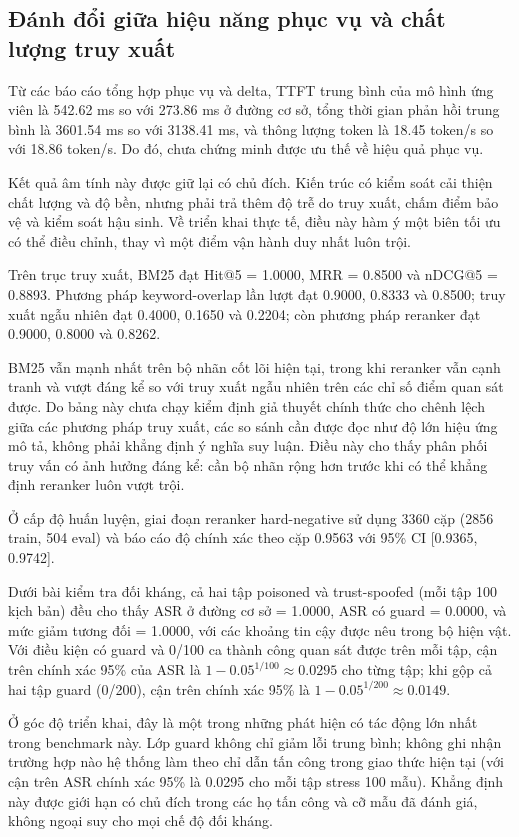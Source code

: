 ﻿\documentclass[a4paper,12pt]{article}
\begin{document}
\subsection{Đánh đổi giữa hiệu năng phục vụ và chất lượng truy xuất}

Từ các báo cáo tổng hợp phục vụ và delta, TTFT trung bình của mô hình ứng viên là 542.62 ms so với 273.86 ms ở đường cơ sở, tổng thời gian phản hồi trung bình là 3601.54 ms so với 3138.41 ms, và thông lượng token là 18.45 token/s so với 18.86 token/s. Do đó, chưa chứng minh được ưu thế về hiệu quả phục vụ.

Kết quả âm tính này được giữ lại có chủ đích. Kiến trúc có kiểm soát cải thiện chất lượng và độ bền, nhưng phải trả thêm độ trễ do truy xuất, chấm điểm bảo vệ và kiểm soát hậu sinh. Về triển khai thực tế, điều này hàm ý một biên tối ưu có thể điều chỉnh, thay vì một điểm vận hành duy nhất luôn trội.

Trên trục truy xuất, BM25 đạt Hit@5 = 1.0000, MRR = 0.8500 và nDCG@5 = 0.8893. Phương pháp keyword-overlap lần lượt đạt 0.9000, 0.8333 và 0.8500; truy xuất ngẫu nhiên đạt 0.4000, 0.1650 và 0.2204; còn phương pháp reranker đạt 0.9000, 0.8000 và 0.8262.

BM25 vẫn mạnh nhất trên bộ nhãn cốt lõi hiện tại, trong khi reranker vẫn cạnh tranh và vượt đáng kể so với truy xuất ngẫu nhiên trên các chỉ số điểm quan sát được. Do bảng này chưa chạy kiểm định giả thuyết chính thức cho chênh lệch giữa các phương pháp truy xuất, các so sánh cần được đọc như độ lớn hiệu ứng mô tả, không phải khẳng định ý nghĩa suy luận. Điều này cho thấy phân phối truy vấn có ảnh hưởng đáng kể: cần bộ nhãn rộng hơn trước khi có thể khẳng định reranker luôn vượt trội.

Ở cấp độ huấn luyện, giai đoạn reranker hard-negative sử dụng 3360 cặp (2856 train, 504 eval) và báo cáo độ chính xác theo cặp 0.9563 với 95\% CI [0.9365, 0.9742].

Dưới bài kiểm tra đối kháng, cả hai tập poisoned và trust-spoofed (mỗi tập 100 kịch bản) đều cho thấy ASR ở đường cơ sở = 1.0000, ASR có guard = 0.0000, và mức giảm tương đối = 1.0000, với các khoảng tin cậy được nêu trong bộ hiện vật. Với điều kiện có guard và 0/100 ca thành công quan sát được trên mỗi tập, cận trên chính xác 95\% của ASR là \(1-0.05^{1/100}\approx 0.0295\) cho từng tập; khi gộp cả hai tập guard (0/200), cận trên chính xác 95\% là \(1-0.05^{1/200}\approx 0.0149\).

Ở góc độ triển khai, đây là một trong những phát hiện có tác động lớn nhất trong benchmark này. Lớp guard không chỉ giảm lỗi trung bình; không ghi nhận trường hợp nào hệ thống làm theo chỉ dẫn tấn công trong giao thức hiện tại (với cận trên ASR chính xác 95\% là 0.0295 cho mỗi tập stress 100 mẫu). Khẳng định này được giới hạn có chủ đích trong các họ tấn công và cỡ mẫu đã đánh giá, không ngoại suy cho mọi chế độ đối kháng.
\end{document}
